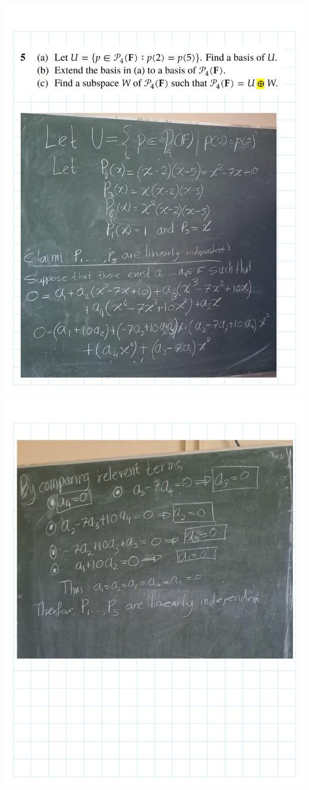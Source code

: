 \documentclass[
]{book}
\theoremstyle{definition}
\theoremstyle{definition}
\theoremstyle{definition}
\theoremstyle{definition}
\theoremstyle{remark}
\begin{document}
\includegraphics{fig/Ex 2B and 2C/Ex 2c (20).png}
\includegraphics{fig/Ex 2B and 2C/Ex 2c (21).png}
\end{document}
